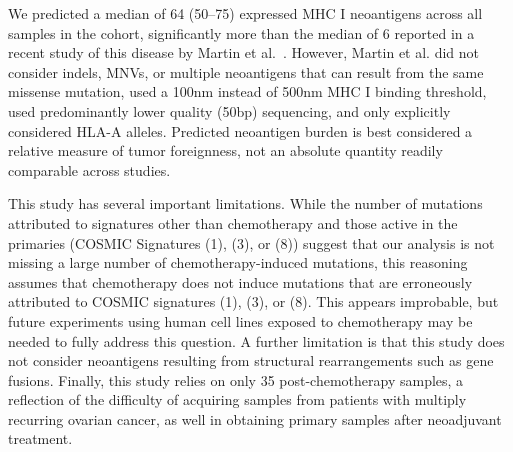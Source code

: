 We predicted a median of 64 (50--75) expressed MHC I neoantigens across all samples in the cohort, significantly more than the median of 6 reported in a recent study of this disease by Martin et al.~\cite{Martin_2016}. However, Martin et al. did not consider indels, MNVs, or multiple neoantigens that can result from the same missense mutation, used a 100nm instead of 500nm MHC I binding threshold, used predominantly lower quality (50bp) sequencing, and only explicitly considered HLA-A alleles. Predicted neoantigen burden is best considered a relative measure of tumor foreignness, not an absolute quantity readily comparable across studies.

This study has several important limitations. While the number of mutations attributed to signatures other than chemotherapy and those active in the primaries (COSMIC Signatures (1), (3), or (8)) suggest that our analysis is not missing a large number of chemotherapy-induced mutations, this reasoning assumes that chemotherapy does not induce mutations that are erroneously attributed to COSMIC signatures (1), (3), or (8). This appears improbable, but future experiments using human cell lines exposed to chemotherapy may be needed to fully address this question. A further limitation is that this study does not consider neoantigens resulting from structural rearrangements such as gene fusions. Finally, this study relies on only 35 post-chemotherapy samples, a reflection of the difficulty of acquiring samples from patients with multiply recurring ovarian cancer, as well in obtaining primary samples after neoadjuvant treatment.